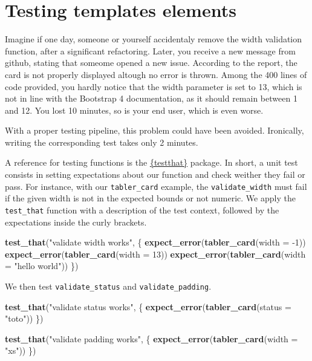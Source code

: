 \documentclass[]{book}
\newenvironment{Shaded}{\begin{snugshade}}{\end{snugshade}}
\newcommand{\DataTypeTok}[1]{\textcolor[rgb]{0.13,0.29,0.53}{#1}}
\newcommand{\DecValTok}[1]{\textcolor[rgb]{0.00,0.00,0.81}{#1}}
\newcommand{\KeywordTok}[1]{\textcolor[rgb]{0.13,0.29,0.53}{\textbf{#1}}}
\newcommand{\NormalTok}[1]{#1}
\newcommand{\StringTok}[1]{\textcolor[rgb]{0.31,0.60,0.02}{#1}}
\begin{document}
\hypertarget{testing-templates-elements}{%
\section{Testing templates elements}\label{testing-templates-elements}}

Imagine if one day, someone or yourself accidentaly remove the width validation function, after a significant refactoring. Later, you receive a new message from github, stating that someome opened a new issue. According to the report, the card is not properly displayed altough no error is thrown. Among the 400 lines of code provided, you hardly notice that the width parameter is set to 13, which is not in line with the Bootstrap 4 documentation, as it should remain between 1 and 12. You lost 10 minutes, so is your end user, which is even worse.

With a proper testing pipeline, this problem could have been avoided. Ironically, writing the corresponding test takes only 2 minutes.

A reference for testing functions is the \href{https://testthat.r-lib.org/index.html}{\{testthat\}} package. In short, a unit test consists in setting expectations about our function and check weither they fail or pass. For instance, with our \texttt{tabler\_card} example, the \texttt{validate\_width} must fail if the given width is not in the expected bounds or not numeric. We apply the \texttt{test\_that} function with a description of the test context, followed by the expectations inside the curly brackets.

\begin{Shaded}
\begin{Highlighting}[]
\KeywordTok{test_that}\NormalTok{(}\StringTok{"validate width works"}\NormalTok{, \{}
  \KeywordTok{expect_error}\NormalTok{(}\KeywordTok{tabler_card}\NormalTok{(}\DataTypeTok{width =} \DecValTok{-1}\NormalTok{))}
  \KeywordTok{expect_error}\NormalTok{(}\KeywordTok{tabler_card}\NormalTok{(}\DataTypeTok{width =} \DecValTok{13}\NormalTok{))}
  \KeywordTok{expect_error}\NormalTok{(}\KeywordTok{tabler_card}\NormalTok{(}\DataTypeTok{width =} \StringTok{"hello world"}\NormalTok{))}
\NormalTok{\})}
\end{Highlighting}
\end{Shaded}

We then test \texttt{validate\_status} and \texttt{validate\_padding}.

\begin{Shaded}
\begin{Highlighting}[]
\KeywordTok{test_that}\NormalTok{(}\StringTok{"validate status works"}\NormalTok{, \{}
  \KeywordTok{expect_error}\NormalTok{(}\KeywordTok{tabler_card}\NormalTok{(}\DataTypeTok{status =} \StringTok{"toto"}\NormalTok{))}
\NormalTok{\})}

\KeywordTok{test_that}\NormalTok{(}\StringTok{"validate padding works"}\NormalTok{, \{}
  \KeywordTok{expect_error}\NormalTok{(}\KeywordTok{tabler_card}\NormalTok{(}\DataTypeTok{width =} \StringTok{"xs"}\NormalTok{))}
\NormalTok{\})}
\end{Highlighting}
\end{Shaded}
\end{document}
